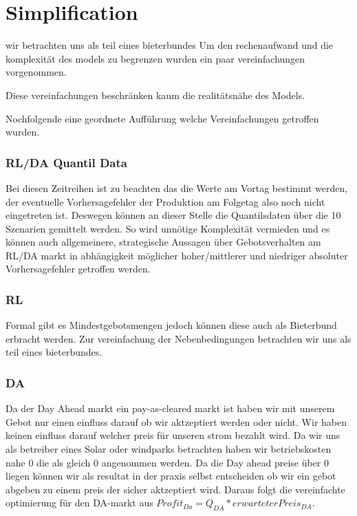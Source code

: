 \section{Simplification}

wir betrachten uns als teil eines bieterbundes
Um den rechenaufwand und die komplexität des models zu begrenzen wurden ein paar vereinfachungen vorgenommen.

Diese vereinfachungen beschränken kaum die realitätsnähe des Models.

Nochfolgende eine geordnete Aufführung welche Vereinfachungen getroffen wurden.

\subsubsection{RL/DA Quantil Data}
Bei diesen Zeitreihen ist zu beachten das die Werte am Vortag bestimmt werden,
der eventuelle Vorhersagefehler der Produktion am Folgetag also noch nicht eingetreten ist.
Deswegen können an dieser Stelle die Quantilsdaten über die 10 Szenarien gemittelt werden.
So wird  unnötige Komplexität vermieden und es können auch allgemeinere, strategische
Aussagen über Gebotsverhalten am RL/DA markt in abhängigkeit möglicher hoher/mittlerer und niedriger
absoluter Vorhersagefehler getroffen werden.


\subsubsection{RL}
Formal gibt es Mindestgebotsmengen jedoch können diese auch als Bieterbund erbracht werden.
Zur vereinfachung der Nebenbedingungen betrachten wir uns als teil eines bieterbundes.

\subsubsection{DA}
Da der Day Ahead markt ein pay-as-cleared markt ist haben wir mit unserem Gebot nur einen einfluss darauf ob wir aktzeptiert werden oder nicht.
Wir haben keinen einfluss darauf welcher preis für unseren strom bezahlt wird.
Da wir uns als betreiber eines Solar oder windparks betrachten haben wir betriebskosten nahe 0 die als gleich 0 angenommen werden.
Da die Day ahead preise über 0 liegen können wir als resultat in der praxis selbst entscheiden ob wir ein gebot abgeben zu einem preis der sicher aktzeptiert wird.
Daraus folgt die vereinfachte optimierung für den DA-markt aus $Profit_{Da} = Q_{DA} * erwarteterPreis_{DA}$.

